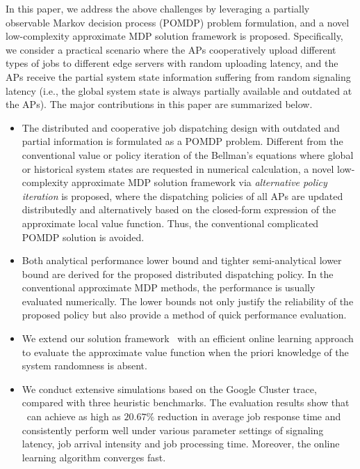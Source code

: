 In this paper, we address the above challenges by leveraging a partially observable Markov decision process (POMDP) problem formulation, and a novel low-complexity approximate MDP solution framework is proposed.
Specifically, we consider a practical scenario where the APs cooperatively upload different types of jobs to different edge servers with random uploading latency, and the APs receive the partial system state information suffering from random signaling latency (i.e., the global system state is always partially available and outdated at the APs).
The major contributions in this paper are summarized below.
\begin{itemize}
    \item The distributed and cooperative job dispatching design with outdated and partial information is formulated as a POMDP problem.
    Different from the conventional value or policy iteration of the Bellman's equations where global or historical system states are requested in numerical calculation, a novel low-complexity approximate MDP solution framework via \emph{alternative policy iteration} is proposed, where the dispatching policies of all APs are updated distributedly and alternatively based on the {closed-form expression} of the approximate local value function.
    Thus, the conventional complicated POMDP solution is avoided.
    \item Both analytical performance lower bound and tighter semi-analytical lower bound are derived for the proposed distributed dispatching policy. In the conventional approximate MDP methods, the performance is usually evaluated numerically.
    The lower bounds not only justify the reliability of the proposed policy but also provide a method of quick performance evaluation.
    \item We extend our solution framework \algname~with an efficient online learning approach to evaluate the approximate value function when the priori knowledge of the system randomness is absent.
    \item We conduct extensive simulations based on the Google Cluster trace, compared with three heuristic benchmarks. The evaluation results show that \algname~can achieve as high as $20.67\%$ reduction in average job response time and consistently perform well under various parameter settings of signaling latency, job arrival intensity and job processing time. {Moreover, the online learning algorithm converges fast.}
\end{itemize}


